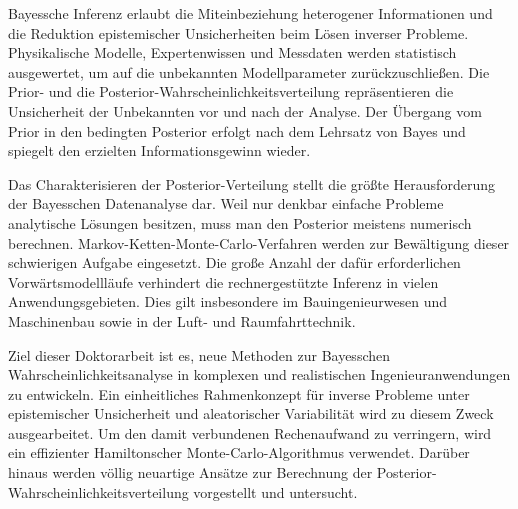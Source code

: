 Bayessche Inferenz erlaubt die Miteinbeziehung heterogener Informationen und die Reduktion epistemischer Unsicherheiten beim Lösen inverser Probleme.
Physikalische Modelle, Expertenwissen und Messdaten werden statistisch ausgewertet, um auf die unbekannten Modellparameter zurückzuschließen.
Die Prior- und die Posterior-Wahrscheinlichkeitsverteilung repräsentieren die Unsicherheit der Unbekannten vor und nach der Analyse.
Der Übergang vom Prior in den bedingten Posterior erfolgt nach dem Lehrsatz von Bayes und spiegelt den erzielten Informationsgewinn wieder.
\par %
Das Charakterisieren der Posterior-Verteilung stellt die größte Herausforderung der Bayesschen Datenanalyse dar.
Weil nur denkbar einfache Probleme analytische Lösungen besitzen, muss man den Posterior meistens numerisch berechnen.
Markov-Ketten-Monte-Carlo-Verfahren werden zur Bewältigung dieser schwierigen Aufgabe eingesetzt.
Die große Anzahl der dafür erforderlichen Vorwärtsmodellläufe verhindert die rechnergestützte Inferenz in vielen Anwendungsgebieten.
Dies gilt insbesondere im Bauingenieurwesen und Maschinenbau sowie in der Luft- und Raumfahrttechnik.
\par %
Ziel dieser Doktorarbeit ist es, neue Methoden zur Bayesschen Wahrscheinlichkeitsanalyse in komplexen und realistischen Ingenieuranwendungen zu entwickeln.
Ein einheitliches Rahmenkonzept für inverse Probleme unter epistemischer Unsicherheit und aleatorischer Variabilität wird zu diesem Zweck ausgearbeitet.
Um den damit verbundenen Rechenaufwand zu verringern, wird ein effizienter Hamiltonscher Monte-Carlo-Algorithmus verwendet.
Darüber hinaus werden völlig neuartige Ansätze zur Berechnung der Posterior-Wahrscheinlichkeitsverteilung vorgestellt und untersucht.